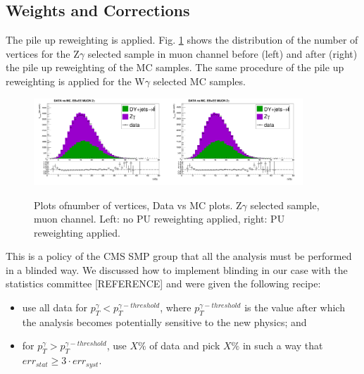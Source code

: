 \subsection{Weights and Corrections}
The pile up reweighting is applied. Fig. \ref{fig:DATAvsMC_nVtx} shows the distribution of the number of vertices for the Z$\gamma$ selected sample in muon channel before (left) and after (right) the pile up reweighting of the MC samples. The same procedure of the pile up reweighting is applied for the W$\gamma$ selected MC samples.
\begin{figure}[htb]
  \begin{center}
   \includegraphics[width=0.45\textwidth]{../figs/figs_v11/MUON_ZGamma/PrepareYields/c_TotalDATAvsMC_EtaCommon__nVtx_noPU.png}\includegraphics[width=0.45\textwidth]{../figs/figs_v11/MUON_ZGamma/PrepareYields/c_TotalDATAvsMC_EtaCommon__nVtx.png}
  \caption{Plots ofnumber of vertices, Data vs MC plots. Z$\gamma$ selected sample, muon channel. Left: no PU reweighting applied, right: PU reweighting applied. }
  \label{fig:DATAvsMC_nVtx}
  \end{center}
\end{figure}

This is a policy of the CMS SMP group that all the analysis must be performed in a blinded way. We discussed how to implement blinding in our case with the statistics committee [REFERENCE] and were given the following recipe:\\
\begin{itemize}
  \item use all data for $p_T^{\gamma}<p_T^{\gamma-threshold}$, where $p_T^{\gamma-threshold}$ is the value after which the analysis becomes potentially sensitive to the new physics; and
  \item for $p_T^{\gamma}>p_T^{\gamma-threshold}$, use $X\%$ of data and pick  $X\%$ in such a way that $err_{stat} \geq 3 \cdot err_{syst}$.
\end{itemize}

